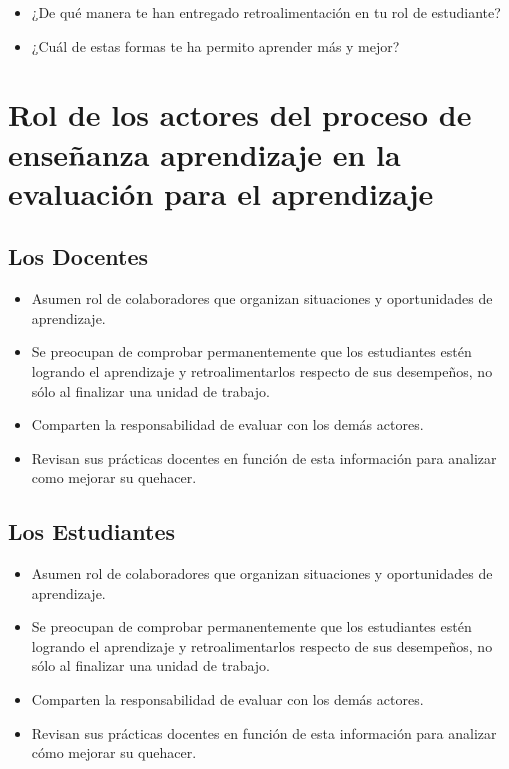 \documentclass[12pt,letterpaper,article,x11names]{memoir}
\begin{document}
\begin{itemize}
\item ¿De qué manera te han entregado retroalimentación en tu rol de estudiante?
\item ¿Cuál de estas formas te ha permito aprender más y mejor?
\end{itemize}

\section{Rol de los actores del proceso de enseñanza aprendizaje en la evaluación para el aprendizaje}
\label{sec:org94f1fbf}
\subsection{Los Docentes}
\label{sec:org4c68bae}
\begin{itemize}
\item Asumen rol de colaboradores que organizan situaciones y oportunidades de aprendizaje.
\item Se preocupan de comprobar permanentemente que los estudiantes estén logrando el aprendizaje y retroalimentarlos respecto de sus desempeños, no sólo al finalizar una unidad de trabajo.
\item Comparten la responsabilidad de evaluar con los demás actores.
\item Revisan sus prácticas docentes en función de esta información para analizar como mejorar su quehacer.
\end{itemize}

\subsection{Los Estudiantes}
\label{sec:org4a0daeb}
\begin{itemize}
\item Asumen rol de colaboradores que organizan situaciones y oportunidades de aprendizaje.
\item Se preocupan de comprobar permanentemente que los estudiantes estén logrando el aprendizaje y retroalimentarlos respecto de sus desempeños, no sólo al finalizar una unidad de trabajo.
\item Comparten la responsabilidad de evaluar con los demás actores.
\item Revisan sus prácticas docentes en función de esta información para analizar cómo mejorar su quehacer.
\end{itemize}
\end{document}
